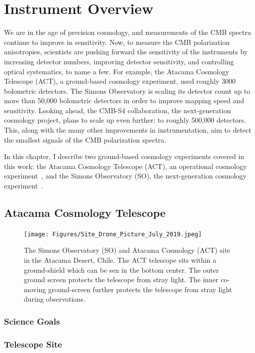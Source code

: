 \chapter{Instrument Overview}
\label{ch:instruments}

We are in the age of precision cosmology, and measurements of the CMB spectra continue to improve in sensitivity.  Now, to measure the CMB polarization anisotropies, scientists are pushing forward the sensitivity of the instruments by increasing detector numbers, improving detector sensitivity, and controlling optical systematics, to name a few.  For example, the Atacama Cosmology Telescope (ACT), a ground-based cosmology experiment, used roughly 3000 bolometric detectors.  The Simons Observatory is scaling its detector count up to more than 50,000 bolometric detectors in order to improve mapping speed and sensitivity.  Looking ahead, the CMB-S4 collaboration, the next-generation cosmology project, plans to scale up even further: to roughly 500,000 detectors.  This, along with the many other improvements in instrumentation, aim to detect the smallest signals of the CMB polarization spectra.

In this chapter, I describe two ground-based cosmology experiments covered in this work: the Atacama Cosmology Telescope (ACT), an operational cosmology experiment~\cite{act_inst}, and the Simons Observatory (SO), the next-generation cosmology experiment~\cite{so19}. 


\section{Atacama Cosmology Telescope}
\begin{figure}[t]
    \centering
    \texttt{[image: Figures/Site\_Drone\_Picture\_July\_2019.jpeg]}
    \caption{The Simons Observatory (SO) and Atacama Cosmology (ACT) site in the Atacama Desert, Chile. The ACT telescope sits within a ground-shield which can be sen in the bottom center.  The outer ground screen protects the telescope from stray light.  The inner co-moving ground-screen further protects the telescope from stray light during observations.}
    \label{fig:act_so_site}
\end{figure}

\subsection{Science Goals}
\subsection{Telescope Site}
